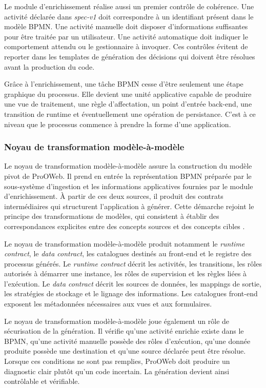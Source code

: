 Le module d'enrichissement réalise aussi un premier contrôle de cohérence. Une activité déclarée dans \textit{spec-v1} doit correspondre à un identifiant présent dans le modèle BPMN. Une activité manuelle doit disposer d'informations suffisantes pour être traitée par un utilisateur. Une activité automatique doit indiquer le comportement attendu ou le gestionnaire à invoquer. Ces contrôles évitent de reporter dans les templates de génération des décisions qui doivent être résolues avant la production du code.

Grâce à l'enrichissement, une tâche BPMN cesse d'être seulement une étape graphique du processus. Elle devient une unité applicative capable de produire une vue de traitement, une règle d'affectation, un point d'entrée back-end, une transition de runtime et éventuellement une opération de persistance. C'est à ce niveau que le processus commence à prendre la forme d'une application.

\subsubsection{Noyau de transformation modèle-à-modèle}

Le noyau de transformation modèle-à-modèle assure la construction du modèle pivot de ProOWeb. Il prend en entrée la représentation BPMN préparée par le sous-système d'ingestion et les informations applicatives fournies par le module d'enrichissement. À partir de ces deux sources, il produit des contrats intermédiaires qui structurent l'application à générer. Cette démarche rejoint le principe des transformations de modèles, qui consistent à établir des correspondances explicites entre des concepts sources et des concepts cibles \cite{omgqvt}.

Le noyau de transformation modèle-à-modèle produit notamment le \textit{runtime contract}, le \textit{data contract}, les catalogues destinés au front-end et le registre des processus générés. Le \textit{runtime contract} décrit les activités, les transitions, les rôles autorisés à démarrer une instance, les rôles de supervision et les règles liées à l'exécution. Le \textit{data contract} décrit les sources de données, les mappings de sortie, les stratégies de stockage et le lignage des informations. Les catalogues front-end exposent les métadonnées nécessaires aux vues et aux formulaires.

Le noyau de transformation modèle-à-modèle joue également un rôle de sécurisation de la génération. Il vérifie qu'une activité enrichie existe dans le BPMN, qu'une activité manuelle possède des rôles d'exécution, qu'une donnée produite possède une destination et qu'une source déclarée peut être résolue. Lorsque ces conditions ne sont pas remplies, ProOWeb doit produire un diagnostic clair plutôt qu'un code incertain. La génération devient ainsi contrôlable et vérifiable.

